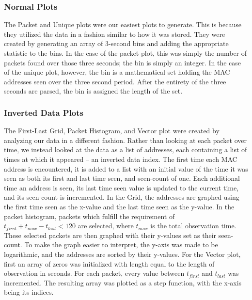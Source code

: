 \subsubsection*{Normal Plots}
The Packet and Unique plots were our easiest plots to generate.
This is because they utilized the data in a fashion similar to how it was stored.
They were created by generating an array of 3-second bins and adding the appropriate statistic to the bins.
In the case of the packet plot, this was simply the number of packets found over those three seconds; the bin is simply an integer.
In the case of the unique plot, however, the bin is a mathematical set holding the MAC addresses seen over the three second period.
After the entirety of the three seconds are parsed, the bin is assigned the length of the set.

\subsubsection*{Inverted Data Plots}
The First-Last Grid, Packet Histogram, and Vector plot were created by analyzing our data in a different fashion.
Rather than looking at each packet over time, we instead looked at the data as a list of addresses, each containing a list of times at which it appeared -- an inverted data index.
The first time each MAC address is encountered, it is added to a list with an initial value of the time it was seen as both its first and last time seen, and seen-count of one.
Each additional time an address is seen, its last time seen value is updated to the current time, and its seen-count is incremented.
In the Grid, the addresses are graphed using the first time seen as the x-value and the last time seen as the y-value.
In the packet histogram, packets which fulfill the requirement of \(t_{first} + t_{max} - t_{last} < 120\) are selected, where \(t_{max}\) is the total observation time.
These selected packets are then graphed with their y-values set as their seen-count.
To make the graph easier to interpret, the y-axis was made to be logarithmic, and the addresses are sorted by their y-values.
For the Vector plot, first an array of zeros was initialized with length equal to the length of observation in seconds.
For each packet, every value between \(t_{first}\) and \(t_{last}\) was incremented.
The resulting array was plotted as a step function, with the x-axis being its indices.

